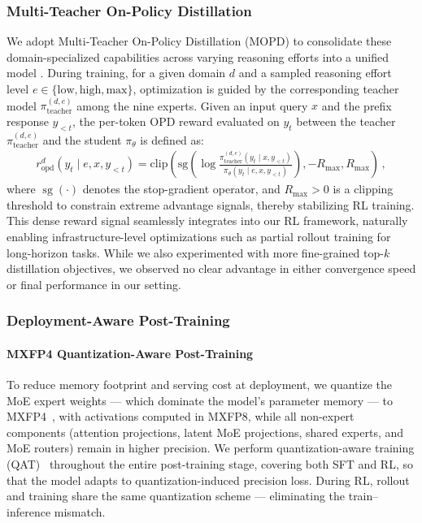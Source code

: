 \subsubsection{Multi-Teacher On-Policy Distillation}

We adopt Multi-Teacher On-Policy Distillation (MOPD) to consolidate these domain-specialized capabilities across varying reasoning efforts into a unified model \citep{lu2025onpolicydistillation, xiao2026mimov2flash, deepseekv4}. 
During training, for a given domain $d$ and a sampled reasoning effort level $e \in \{\text{low}, \text{high}, \text{max}\}$, optimization is guided by the corresponding teacher model $\pi_{\text{teacher}}^{(d,e)}$ among the nine experts. 
Given an input query $x$ and the prefix response $y_{<t}$, the per-token OPD reward evaluated on $y_t$ between the teacher $\pi_{\text{teacher}}^{(d,e)}$ and the student $\pi_{\theta}$ is defined as:
\begin{align}
r^{d}_{\mathrm{opd}}(y_t \mid e, x, y_{<t}) = \mathrm{clip}\left( \mathrm{sg} \left(\log \frac{\pi_{\text{teacher}}^{(d,e)}(y_t \mid x, y_{<t})}{\pi_{\theta}(y_t \mid e, x, y_{<t})} \right) , -R_{\max}, R_{\max} \right)\, ,
\end{align}
where $\operatorname{sg}(\cdot)$ denotes the stop-gradient operator, and $R_{\max} > 0$ is a clipping threshold to constrain extreme advantage signals, thereby stabilizing RL training. 
This dense reward signal seamlessly integrates into our RL framework, naturally enabling infrastructure-level optimizations such as partial rollout training for long-horizon tasks. 
While we also experimented with more fine-grained top-$k$ distillation objectives, we observed no clear advantage in either convergence speed or final performance in our setting. 

\subsubsection{Deployment-Aware Post-Training}


\paragraph{MXFP4 Quantization-Aware Post-Training}
\label{sec:mxfp4-qat}

To reduce memory footprint and serving cost at deployment, we quantize the MoE expert weights --- which dominate the model's parameter memory --- to MXFP4~\citep{rouhani2023microscaling}, with activations computed in MXFP8, while all non-expert components (attention projections, latent MoE projections, shared experts, and MoE routers) remain in higher precision.
We perform quantization-aware training (QAT)~\citep{jacob2018quantization} throughout the entire post-training stage, covering both SFT and RL, so that the model adapts to quantization-induced precision loss.
During RL, rollout and training share the same quantization scheme --- eliminating the train--inference mismatch.


